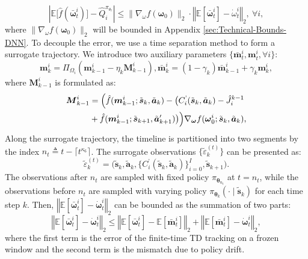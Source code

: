 \documentclass{IEEEtran}
\begin{document}
\begin{equation}
\left|\mathbb{E}\big[\hat{f}(\bar{\boldsymbol{\omega}}_{t}^{i})\big]-\hat{Q}_{i}^{\pi_{\theta_{t}}}\right|\le\|\nabla_{\omega}f(\boldsymbol{\omega}_{0})\|_{2}\cdot\left\Vert \mathbb{E}[\bar{\boldsymbol{\omega}}_{t}^{i}]-\dot{\omega}_{t}^{i}\right\Vert _{2},\ \forall i,
\end{equation}
where $\|\nabla_{\omega}f(\boldsymbol{\omega}_{0})\|_{2}$ will be bounded in Appendix \ref{sec:Technical-Bounds-DNN}. To decouple the error, we use a time separation method to form a surrogate trajectory. We introduce two auxiliary parameters $\{\bar{\boldsymbol{m}}_{t}^{i},\boldsymbol{m}_{t}^{i},\forall i\}$:
\begin{equation}
\boldsymbol{m}_{k}^{i}=\Pi_{\Omega_{i}}\!\left(\boldsymbol{m}_{k-1}^{i}-\eta_{k}\boldsymbol{M}_{k-1}^{i}\right),\bar{\boldsymbol{m}}_{k}^{i}=(1-\gamma_{k})\bar{\boldsymbol{m}}_{k-1}^{i}+\gamma_{k}\boldsymbol{m}_{k}^{i},
\end{equation}
where $\boldsymbol{M}_{k-1}^{i}$ is formulated as:
\begin{align}
\boldsymbol{M}_{k-1}^{i} & =\Bigl(\hat{f}(\boldsymbol{m}_{k-1}^{i};\tilde{\boldsymbol{s}}_{k},\tilde{\boldsymbol{a}}_{k})-\bigl(C_{i}^{\text{'}}(\tilde{\boldsymbol{s}}_{k},\tilde{\boldsymbol{a}}_{k})-\hat{J}_{i}^{k-1}\nonumber \\
& +\hat{f}(\boldsymbol{m}_{k-1}^{i};\tilde{\boldsymbol{s}}_{k+1},\tilde{\boldsymbol{a}}_{k+1}')\bigr)\Bigr)\nabla_{\boldsymbol{\omega}}f(\boldsymbol{\omega}_{0}^{i};\tilde{\boldsymbol{s}}_{k},\tilde{\boldsymbol{a}}_{k}),
\end{align}
Along the surrogate trajectory, the timeline is partitioned into two segments by the index $n_{t}\triangleq t-\lceil t^{\kappa_{6}}\rceil$. The surrogate observations $\{\tilde{\varepsilon}_{k}^{(t)}\}$ can be presented as:
\begin{equation}
\tilde{\varepsilon}_{k}^{(t)}=\bigl(\tilde{\boldsymbol{s}}_{k},\tilde{\boldsymbol{a}}_{k},\{C_{i}^{\text{'}}(\tilde{\boldsymbol{s}}_{k},\tilde{\boldsymbol{a}}_{k})\}_{i=0}^{I},\tilde{\boldsymbol{s}}_{k+1}\bigr).
\end{equation}
The observations after $n_{t}$ are sampled with fixed policy $\pi_{\boldsymbol{\theta}_{n_{t}}}$ at $t=n_{t}$, while the observations before $n_{t}$ are sampled with varying policy $\pi_{\boldsymbol{\theta}_{k}}(\cdot\mid\tilde{\boldsymbol{s}}_{k})$ for each time step $k$. Then, $\left\Vert \mathbb{E}[\bar{\boldsymbol{\omega}}_{t}^{i}]-\dot{\boldsymbol{\omega}}_{t}^{i}\right\Vert _{2}$ can be bounded as the summation of two parts:
\begin{equation}
\left\Vert \mathbb{E}[\bar{\boldsymbol{\omega}}_{t}^{i}]-\dot{\boldsymbol{\omega}}_{t}^{i}\right\Vert _{2}\le\left\Vert \mathbb{E}[\bar{\boldsymbol{\omega}}_{t}^{i}]-\mathbb{E}[\bar{\boldsymbol{m}}_{t}^{i}]\right\Vert _{2}+\left\Vert \mathbb{E}[\bar{\boldsymbol{m}}_{t}^{i}]-\dot{\boldsymbol{\omega}}_{t}^{i}\right\Vert _{2},
\end{equation}
where the first term is the error of the finite-time TD tracking on a frozen window and the second term is the mismatch due to policy drift. 
\end{document}
